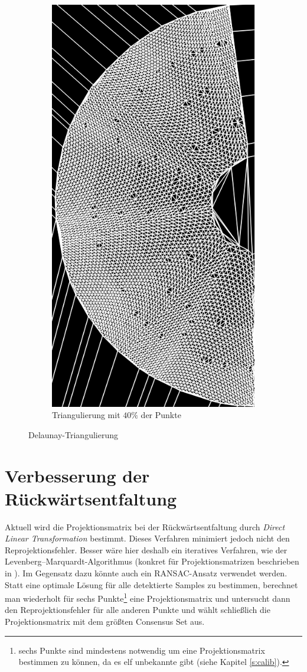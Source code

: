 \begin{figure}[!htb]
\begin{subfigure}{.9\textwidth}
		\includegraphics[angle=-90, width=.8\textwidth]{images/delaunay2.png}
		\caption{Triangulierung mit $40\%$ der Punkte}
	\end{subfigure}
	\caption{Delaunay-Triangulierung}
	\label{fig:delaunayTriag}
\end{figure}


\section{Verbesserung der Rückwärtsentfaltung}
Aktuell wird die Projektionsmatrix bei der Rückwärtsentfaltung durch \textit{Direct Linear Transformation} bestimmt. Dieses Verfahren minimiert jedoch nicht den Reprojektionsfehler. Besser wäre hier deshalb ein iteratives Verfahren, wie der Levenberg–Marquardt-Algorithmus (konkret für Projektionsmatrizen beschrieben in \cite{Hartley2000}).
Im Gegensatz dazu könnte auch ein RANSAC-Ansatz verwendet werden. Statt eine optimale Lösung für alle detektierte Samples zu bestimmen, berechnet man wiederholt für sechs Punkte\footnote{sechs Punkte sind mindestens notwendig um eine Projektionsmatrix bestimmen zu können, da es elf unbekannte gibt (siehe Kapitel \ref{s:calib}).} eine Projektionsmatrix und untersucht dann den Reprojektionsfehler für alle anderen Punkte und wählt schließlich die Projektionsmatrix mit dem größten Consensus Set aus. 


